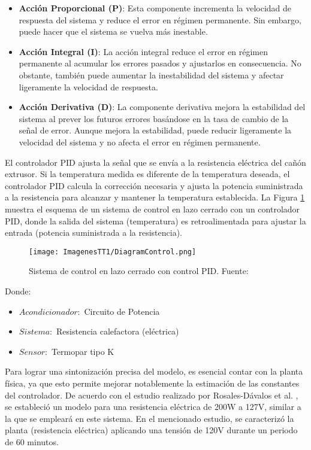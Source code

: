 \documentclass[14pt,oneside]{extarticle} %
\begin{document}
\begin{itemize}
    \item \textbf{Acción Proporcional (P)}: Esta componente incrementa la velocidad de respuesta del sistema y reduce el error en régimen permanente. Sin embargo, puede hacer que el sistema se vuelva más inestable.
    \item \textbf{Acción Integral (I)}: La acción integral reduce el error en régimen permanente al acumular los errores pasados y ajustarlos en consecuencia. No obstante, también puede aumentar la inestabilidad del sistema y afectar ligeramente la velocidad de respuesta.
    \item \textbf{Acción Derivativa (D)}: La componente derivativa mejora la estabilidad del sistema al prever los futuros errores basándose en la tasa de cambio de la señal de error. Aunque mejora la estabilidad, puede reducir ligeramente la velocidad del sistema y no afecta el error en régimen permanente.
\end{itemize}

El controlador PID ajusta la señal que se envía a la resistencia eléctrica del cañón extrusor. Si la temperatura medida es diferente de la temperatura deseada, el controlador PID calcula la corrección necesaria y ajusta la potencia suministrada a la resistencia para alcanzar y mantener la temperatura establecida. La Figura \ref{fig:pid_control} muestra el esquema de un sistema de control en lazo cerrado con un controlador PID, donde la salida del sistema (temperatura) es retroalimentada para ajustar la entrada (potencia suministrada a la resistencia).

\begin{figure}[h!]
    \centering
    \texttt{[image: ImagenesTT1/DiagramControl.png]}
    \caption{Sistema de control en lazo cerrado con control PID. Fuente: \cite{control-pid}}
    \label{fig:pid_control}
\end{figure}

\newpage

Donde:

\begin{itemize}
    \item $Acondicionador :$ Circuito de Potencia
    \item $Sistema : $ Resistencia calefactora (eléctrica)
    \item $Sensor : $ Termopar tipo K
\end{itemize}

Para lograr una sintonización precisa del modelo, es esencial contar con la planta física, ya que esto permite mejorar notablemente la estimación de las constantes del controlador. De acuerdo con el estudio realizado por Rosales-Dávalos et al. \cite{rosales2020}, se estableció un modelo para una resistencia eléctrica de 200W a 127V, similar a la que se empleará en este sistema. En el mencionado estudio, se caracterizó la planta (resistencia eléctrica) aplicando una tensión de 120V durante un periodo de 60 minutos. 
\end{document}
